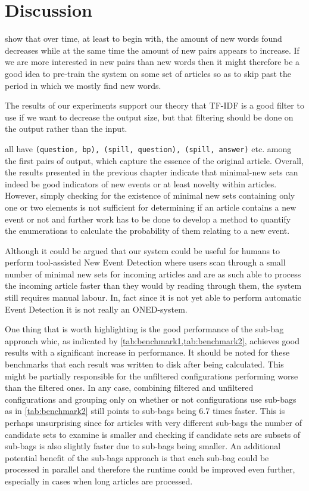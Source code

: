 \chapter{Discussion}
\label{chapter:discussion}

 show that over time, at least to begin with, the amount of new words found decreases while at the same time the amount of new pairs appears to increase. If we are more interested in new pairs than new words then it might therefore be a good idea to pre-train the system on some set of articles so as to skip past the period in which we mostly find new words.

The results of our experiments support our theory that TF-IDF is a good filter to use if we want to decrease the output size, but that filtering should be done on the output rather than the input.

 all have \lstinline{(question, bp), (spill, question), (spill, answer)} etc. among the first pairs of output, which capture the essence of the original article. Overall, the results presented in the previous chapter indicate that minimal-new sets can indeed be good indicators of new events or at least novelty within articles. However, simply checking for the existence of minimal new sets containing only one or two elements is not sufficient for determining if an article contains a new event or not and further work has to be done to develop a method to quantify the enumerations to calculate the probability of them relating to a new event.

Although it could be argued that our system could be useful for humans to perform tool-assisted New Event Detection where users scan through a small number of minimal new sets for incoming articles and are as such able to process the incoming article faster than they would by reading through them, the system still requires manual labour. In, fact since it is not yet able to perform automatic Event Detection it is not really an ONED-system.

One thing that is worth highlighting is the good performance of the sub-bag approach whic, as indicated by \cref{tab:benchmark1,tab:benchmark2}, achieves good results with a significant increase in performance. It should be noted for these benchmarks that each result was written to disk after being calculated. This might be partially responsible for the unfiltered configurations performing worse than the filtered ones. In any case, combining filtered and unfiltered configurations and grouping only on whether or not configurations use sub-bags as in \cref{tab:benchmark2} still points to sub-bags being 6.7 times faster. This is perhaps unsurprising since for articles with very different sub-bags the number of candidate sets to examine is smaller and checking if candidate sets are subsets of sub-bags is also slightly faster due to sub-bags being smaller. An additional potential benefit of the sub-bags approach is that each sub-bag could be processed in parallel and therefore the runtime could be improved even further, especially in cases when long articles are processed.

